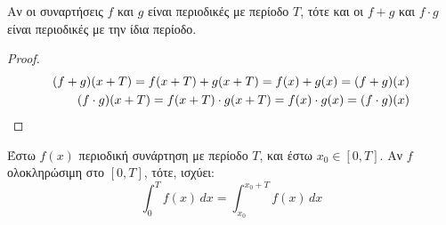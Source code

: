   \begin{prop}
    Αν οι συναρτήσεις $ f $ και $g$ είναι περιοδικές με περίοδο $T$, τότε και οι 
    $ f+g $ και $ f\cdot g $ είναι περιοδικές με την ίδια περίοδο.
  \end{prop}
  \begin{proof}
    \begin{align*}
      (f+g)(x+T) = f(x+T)+g(x+T)=f(x)+g(x)=(f+g)(x) \\
      (f\cdot g)(x+T) = f(x+T)\cdot g(x+T)=f(x)\cdot g(x)=(f\cdot g)(x) \hfill
    \end{align*}
  \end{proof}

  \begin{prop}
    Έστω $ f(x) $ περιοδική συνάρτηση με περίοδο $T$, και έστω $ x_{0} \in [0,T] $. 
    Αν $f$ ολοκληρώσιμη στο $ [0,T] $, τότε, ισχύει:
    \[
      \int _{0}^{T} f(x) \,{dx} = \int _{x_{0}}^{x_{0}+T} f(x) \,{dx}  
    \] 
  \end{prop}

